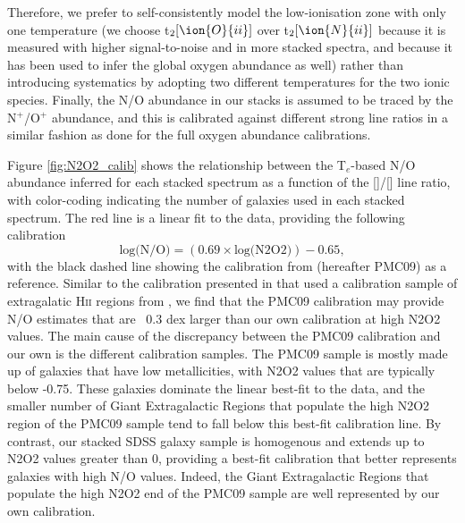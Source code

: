 \documentclass[usenatbib]{mnras} %
\begin{document}
Therefore, we prefer to self-consistently model the low-ionisation zone with only one temperature (we choose t$_{2}[\ion{O}{ii}]$ over t$_{2}[\ion{N}{ii}]$ because it is measured with higher signal-to-noise and in more stacked spectra, and because it has been used to infer the global oxygen abundance as well) rather than introducing systematics by adopting two different temperatures for the two ionic species.
Finally, the N/O abundance in our stacks is assumed to be traced by the N$^+$/O$^+$ abundance, and this is calibrated against different strong line ratios in a similar fashion as done for the full oxygen abundance calibrations.

Figure \ref{fig:N2O2_calib} shows the relationship between the T$_{e}$-based N/O abundance inferred for each stacked spectrum as a function of the []/[] line ratio, with color-coding indicating the number of galaxies used in each stacked spectrum. The red line is a linear fit to the data, providing the following calibration
\begin{equation}\label{N2O2_eq}
\text{log(N/O)} = \left(0.69 \times \text{log(N2O2)}\right) - 0.65,
\end{equation}
with the black dashed line showing the calibration from \cite{PMC_2009} (hereafter PMC09) as a reference. Similar to the calibration presented in \cite{Strom_2017} that used a calibration sample of extragalatic \textsc{Hii} regions from \cite{Pilyugin_2012}, we find that the PMC09 calibration may provide N/O estimates that are ~0.3 dex larger than our own calibration at high N2O2 values. The main cause of the discrepancy between the PMC09 calibration and our own is the different calibration samples. The PMC09 sample is mostly made up of  galaxies that have low metallicities, with N2O2 values that are typically below -0.75. These galaxies dominate the linear best-fit to the data, and the smaller number of Giant Extragalactic  Regions that populate the high N2O2 region of the PMC09 sample tend to fall below this best-fit calibration line. By contrast, our stacked SDSS galaxy sample is homogenous and extends up to N2O2 values greater than 0, providing a best-fit calibration that better represents galaxies with high N/O values. Indeed, the Giant Extragalactic  Regions that populate the high N2O2 end of the PMC09 sample are well represented by our own calibration.
\end{document}
